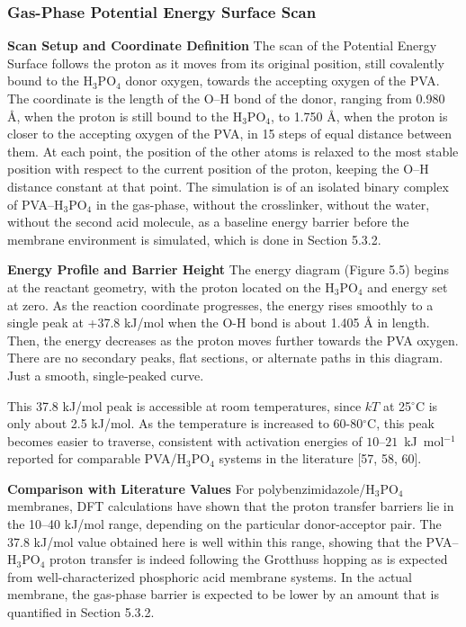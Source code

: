 \documentclass[12pt,a4paper]{report}
\begin{document}
\subsubsection{Gas-Phase Potential Energy Surface Scan}

\textbf{Scan Setup and Coordinate Definition}
The scan of the Potential Energy Surface follows the proton as it moves from its original position, still covalently bound to the H\(_3\)PO\(_4\) donor oxygen, towards the accepting oxygen of the PVA. The coordinate is the length of the O–H bond of the donor, ranging from 0.980 Å, when the proton is still bound to the H\(_3\)PO\(_4\), to 1.750 Å, when the proton is closer to the accepting oxygen of the PVA, in 15 steps of equal distance between them. At each point, the position of the other atoms is relaxed to the most stable position with respect to the current position of the proton, keeping the O–H distance constant at that point.\cite{81,82} The simulation is of an isolated binary complex of PVA–H\(_3\)PO\(_4\) in the gas-phase, without the crosslinker, without the water, without the second acid molecule, as a baseline energy barrier before the membrane environment is simulated, which is done in Section 5.3.2.

\textbf{Energy Profile and Barrier Height}
The energy diagram (Figure 5.5) begins at the reactant geometry, with the proton located on the H\(_3\)PO\(_4\) and energy set at zero. As the reaction coordinate progresses, the energy rises smoothly to a single peak at +37.8 kJ/mol when the O-H bond is about 1.405 Å in length. Then, the energy decreases as the proton moves further towards the PVA oxygen. There are no secondary peaks, flat sections, or alternate paths in this diagram. Just a smooth, single-peaked curve.

This 37.8 kJ/mol peak is accessible at room temperatures, since \(kT\) at 25\(^\circ\)C is only about 2.5 kJ/mol. As the temperature is increased to 60-80\(^\circ\)C, this peak becomes easier to traverse, consistent with activation energies of $10$--$21$~kJ~mol$^{-1}$ reported for comparable PVA/H$_3$PO$_4$ systems in the literature [57, 58, 60].

\textbf{Comparison with Literature Values}
For polybenzimidazole/H\(_3\)PO\(_4\) membranes, DFT calculations have shown that the proton transfer barriers lie in the 10–40 kJ/mol range, depending on the particular donor-acceptor pair. \cite{20,59} The 37.8 kJ/mol value obtained here is well within this range, showing that the PVA–H\(_3\)PO\(_4\) proton transfer is indeed following the Grotthuss hopping as is expected from well-characterized phosphoric acid membrane systems. In the actual membrane, the gas-phase barrier is expected to be lower by an amount that is quantified in Section 5.3.2.
\end{document}
